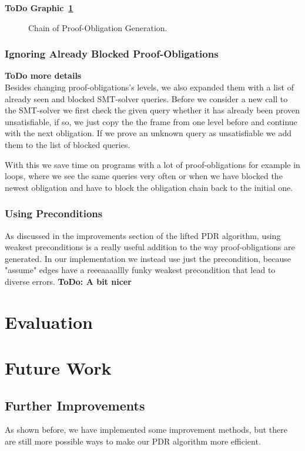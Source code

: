 \documentclass[11pt, a4paper, BCOR=10mm, ngerman, oneside]{scrbook}
\begin{document}
\textbf{ToDo Graphic~\ref{fig:the_nice_figure}}

\begin{figure}[H]
\centering
\resizebox{0.9\textwidth}{!}{}
\caption{Chain of Proof-Obligation Generation.}
\label{fig:the_nice_figure}
\end{figure}
 

\subsection{Ignoring Already Blocked Proof-Obligations}
\textbf{ToDo more details} \\
Besides changing proof-obligations's levels, we also expanded them with a list of already seen and blocked SMT-solver queries. Before we consider a new call to the SMT-solver we first check the given query whether it has already been proven unsatisfiable, if so, we just copy the the frame from one level before and continue with the next obligation. If we prove an unknown query as unsatisfiable we add them to the list of blocked queries. \par
With this we save time on programs with a lot of proof-obligations for example in loops, where we see the same queries very often or when we have blocked the newest obligation and have to block the obligation chain back to the initial one.

\subsection{Using Preconditions}
As discussed in the improvements section of the lifted PDR algorithm, using weakest preconditions is a really useful addition to the way proof-obligations are generated. In our implementation we instead use just the precondition, because "assume" edges have a reeeaaaallly funky weakest precondition that lead to diverse errors.
\textbf{ToDo: A bit nicer}


\chapter{Evaluation}


\chapter{Future Work}
\section{Further Improvements}
As shown before, we have implemented some improvement methods, but there are still more possible ways to make our PDR algorithm more efficient.
\end{document}
